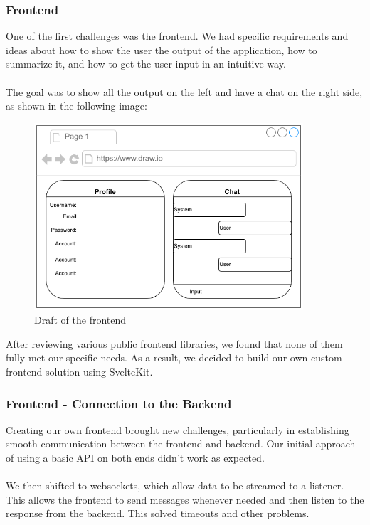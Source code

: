 \documentclass[
    a4paper,
    pagesize,
	pdftex,
    12pt,
]{scrartcl}
\begin{document}
\subsubsection{Frontend}
One of the first challenges was the frontend. We had specific requirements and ideas about how to show the user the output of the application, how to summarize it, and how to get the user input in an intuitive way.
\\ \\
The goal was to show all the output on the left and have a chat on the right side, as shown in the following image:
\begin{figure}[H]
	\centering
	\includegraphics[width=10cm]{Frontend-draft.png}
	\caption{Draft of the frontend}
	\label{fig:draft-frontend}
\end{figure} 
After reviewing various public frontend libraries, we found that none of them fully met our specific needs. As a result, we decided to build our own custom frontend solution using SvelteKit.

\subsubsection{Frontend - Connection to the Backend}
Creating our own frontend brought new challenges, particularly in establishing smooth communication between the frontend and backend. Our initial approach of using a basic API on both ends didn't work as expected.
\\ \\
We then shifted to websockets, which allow data to be streamed to a listener. This allows the frontend to send messages whenever needed and then listen to the response from the backend. This solved timeouts and other problems.
\end{document}
